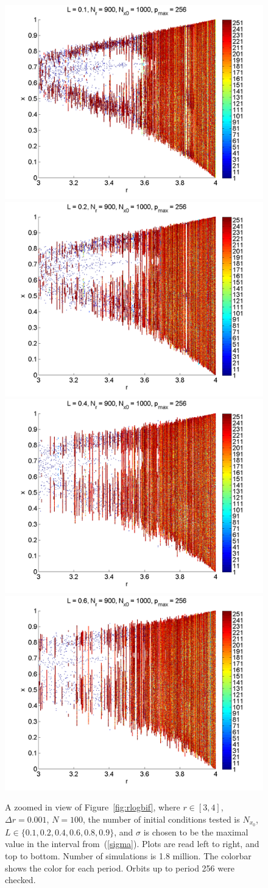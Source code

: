 \begin{figure}[H]\linespread{1}
\caption[Bifurcation diagram of the random logistic map, $\sigma=\sigma_{max}$, zoomed
in]{A zoomed in view of Figure~\ref{fig:rlogbif}, where $r \in
  [3,4]$, $\Delta r = 0.001$, $N=100$, the number of initial
  conditions tested is $N_{x_0}$, $L\in \{0.1,0.2,0.4,0.6,0.8,0.9\}$,
  and $\sigma$ is chosen to be the maximal
value in the interval from~(\ref{sigma}). Plots are read left to right, and top to
bottom. Number of simulations is 1.8 million. The colorbar shows the color for each period. Orbits up to period 256 were checked.}\label{fig:rlogbif_zoom}
	\begin{center}
		\includegraphics[width=.5\textwidth]{figs/rlog_bif_zoom_L_01.png}\hfill
		\includegraphics[width=.5\textwidth]{figs/rlog_bif_zoom_L_02.png}\\
		\includegraphics[width=.5\textwidth]{figs/rlog_bif_zoom_L_04.png}\hfill
		\includegraphics[width=.5\textwidth]{figs/rlog_bif_zoom_L_06.png}\\

\end{center}
\end{figure}
